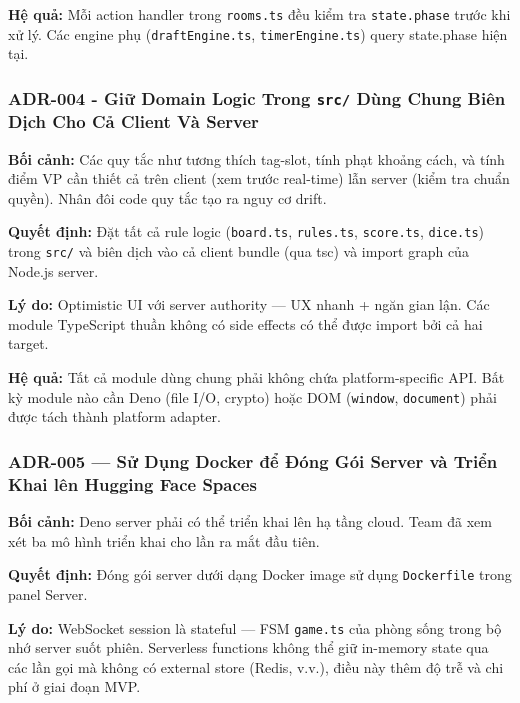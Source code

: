 \textbf{Hệ quả:} Mỗi action handler trong \texttt{rooms.ts} đều kiểm tra \texttt{state.phase} trước khi xử lý. Các engine phụ (\texttt{draftEngine.ts}, \texttt{timerEngine.ts}) query state.phase hiện tại.


\subsubsection*{ADR-004 - Giữ Domain Logic Trong \texttt{src/} Dùng Chung Biên Dịch Cho Cả Client Và Server}

\textbf{Bối cảnh:} Các quy tắc như tương thích tag-slot, tính phạt khoảng cách, và tính điểm VP cần thiết cả trên client (xem trước real-time) lẫn server (kiểm tra chuẩn quyền). Nhân đôi code quy tắc tạo ra nguy cơ drift.

\textbf{Quyết định:} Đặt tất cả rule logic (\texttt{board.ts}, \texttt{rules.ts}, \texttt{score.ts}, \texttt{dice.ts}) trong \texttt{src/} và biên dịch vào cả client bundle (qua tsc) và import graph của Node.js server.

\textbf{Lý do:} Optimistic UI với server authority --- UX nhanh + ngăn gian lận. Các module TypeScript thuần không có side effects có thể được import bởi cả hai target.

\textbf{Hệ quả:} Tất cả module dùng chung phải không chứa platform-specific API. Bất kỳ module nào cần Deno (file I/O, crypto) hoặc DOM (\texttt{window}, \texttt{document}) phải được tách thành platform adapter.


\subsubsection*{ADR-005 — Sử Dụng Docker để Đóng Gói Server và Triển Khai lên Hugging Face Spaces}

\textbf{Bối cảnh:} Deno server phải có thể triển khai lên hạ tầng cloud. Team đã xem xét ba mô hình triển khai cho lần ra mắt đầu tiên.

\textbf{Quyết định:} Đóng gói server dưới dạng Docker image sử dụng \texttt{Dockerfile} trong panel Server.

\textbf{Lý do:} WebSocket session là stateful --- FSM \texttt{game.ts} của phòng sống trong bộ nhớ server suốt phiên. Serverless functions không thể giữ in-memory state qua các lần gọi mà không có external store (Redis, v.v.), điều này thêm độ trễ và chi phí ở giai đoạn MVP.

